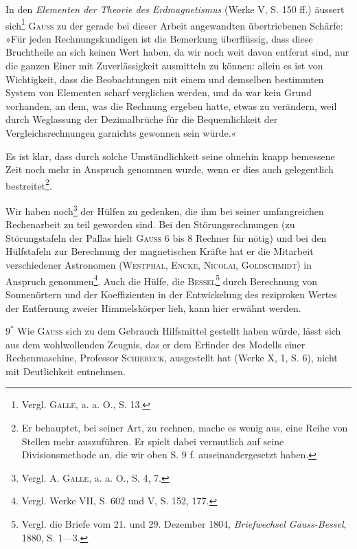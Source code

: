 In den \textit{Elementen der Theorie des Erdmagnetismus} (Werke V, S. 150 ff.)
äussert sich\footnote{Vergl. \textsc{Galle}, a. a. O., S. 13.} \textsc{Gauss} zu der gerade bei dieser Arbeit angewandten übertriebenen
Schärfe: »Für jeden Rechnungskundigen ist die Bemerkung überflüssig, dass
diese Bruchtheile an sich keinen Wert haben, da wir noch weit davon entfernt
sind, nur die ganzen Einer mit Zuverlässigkeit ausmitteln zu können: allein
es ist von Wichtigkeit, dass die Beobachtungen mit einem und demselben
bestimmten System von Elementen scharf verglichen werden, und da war kein
Grund vorhanden, an dem, was die Rechnung ergeben hatte, etwas zu verändern, weil durch Weglassung der Dezimalbrüche für die Bequemlichkeit
der Vergleichsrechnungen garnichts gewonnen sein würde.«

Es ist klar, dass durch solche Umständlichkeit seine ohnehin knapp bemessene Zeit noch mehr in Anspruch genommen wurde, wenn er dies auch
gelegentlich bestreitet\footnote{Er behauptet, bei seiner Art, zu rechnen, mache es wenig aus, eine Reihe von Stellen mehr auszuführen. Er spielt dabei vermutlich auf seine Divisionsmethode an, die wir oben S. 9 f. auseinandergesetzt
haben.}.

Wir haben noch\footnote{Vergl. A. \textsc{Galle}, a. a. O., S. 4, 7.} der Hülfen zu gedenken, die ihm bei seiner umfangreichen Rechenarbeit zu teil geworden sind. Bei den Störungsrechnungen (zu
Störungstafeln der Pallas hielt \textsc{Gauss} 6 bis 8 Rechner für nötig) und bei den
Hülfstafeln zur Berechnung der magnetischen Kräfte hat er die Mitarbeit
verschiedener Astronomen (\textsc{Westphal}, \textsc{Encke}, \textsc{Nicolai}, \textsc{Goldschmidt}) in Anspruch genommen\footnote{Vergl. Werke VII, S. 602 und V, S. 152, 177.}. Auch die Hülfe, die \textsc{Bessel}\footnote{Vergl. die Briefe vom 21. und 29. Dezember 1804, \textit{Briefwechsel Gauss-Bessel}, 1880, S. 1—3.} durch Berechnung von
Sonnenörtern und der Koeffizienten in der Entwickelung des reziproken Wertes
der Entfernung zweier Himmelskörper lieh, kann hier erwähnt werden.
\par\hfill $9^{\ast}$
\clearpage{}
\setcounter{footnote}{0}
\noindent\hspace*{\parindent}Wie \textsc{Gauss} sich zu dem Gebrauch  Hilfsmittel gestellt
haben würde, lässt sich aus dem wohlwollenden Zeugnis, das er dem Erfinder
des Modells einer Rechenmaschine, Professor \textsc{Schiereck}, ausgestellt hat (Werke
X, 1, S. 6), nicht mit Deutlichkeit entnehmen.

